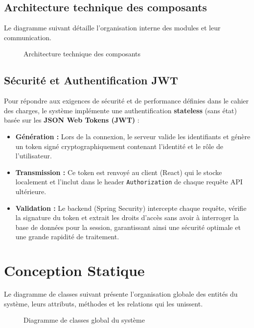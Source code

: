 \documentclass[12pt,a4paper]{article}
\begin{document}
\subsection{Architecture technique des composants}

Le diagramme suivant détaille l'organisation interne des modules et leur communication.

\begin{figure}[H]
    \centering
    \caption{Architecture technique des composants}
\end{figure}

\subsection{Sécurité et Authentification JWT}
\label{subsec:securite_jwt}

Pour répondre aux exigences de sécurité et de performance définies dans le cahier des charges, le système implémente une authentification \textbf{stateless} (sans état) basée sur les \textbf{JSON Web Tokens (JWT)} :

\begin{itemize}[label=\textcolor{primary}{\textbullet}]
    \item \textbf{Génération :} Lors de la connexion, le serveur valide les identifiants et génère un token signé cryptographiquement contenant l'identité et le rôle de l'utilisateur.
    \item \textbf{Transmission :} Ce token est renvoyé au client (React) qui le stocke localement et l'inclut dans le header \texttt{Authorization} de chaque requête API ultérieure.
    \item \textbf{Validation :} Le backend (Spring Security) intercepte chaque requête, vérifie la signature du token et extrait les droits d'accès sans avoir à interroger la base de données pour la session, garantissant ainsi une sécurité optimale et une grande rapidité de traitement.
\end{itemize}

\section{Conception Statique}
\label{sec:statique}

Le diagramme de classes suivant présente l'organisation globale des entités du système, leurs attributs, méthodes et les relations qui les unissent.

\begin{figure}[H]
    \centering
    \caption{Diagramme de classes global du système}
\end{figure}
\end{document}
